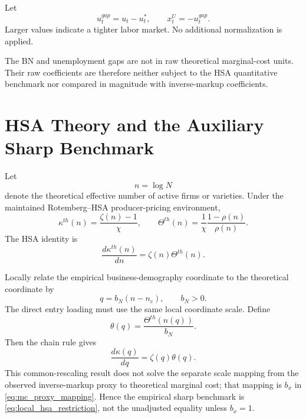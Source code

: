 \documentclass[11pt]{article}
\begin{document}
Let
\begin{equation}
u_t^{gap}=u_t-u_t^\ast,
\qquad
x_t^U=-u_t^{gap}.
\end{equation}
Larger values indicate a tighter labor market. No additional normalization is applied.

The BN and unemployment gaps are not in raw theoretical marginal-cost units. Their raw coefficients are therefore neither subject to the HSA quantitative benchmark nor compared in magnitude with inverse-markup coefficients.

\section{HSA Theory and the Auxiliary Sharp Benchmark}
\label{sec:hsa_benchmark}

Let
\begin{equation}
n=\log N
\end{equation}
denote the theoretical effective number of active firms or varieties. Under the maintained Rotemberg--HSA producer-pricing environment,
\begin{equation}
\kappa^{th}(n)=\frac{\zeta(n)-1}{\chi},
\qquad
\Theta^{th}(n)=\frac{1}{\chi}\frac{1-\rho(n)}{\rho(n)}.
\end{equation}
The HSA identity is
\begin{equation}
\frac{d\kappa^{th}(n)}{dn}=\zeta(n)\Theta^{th}(n).
\label{eq:hsa_identity}
\end{equation}

Locally relate the empirical business-demography coordinate to the theoretical coordinate by
\begin{equation}
q=b_N(n-n_c),
\qquad b_N>0.
\end{equation}
The direct entry loading must use the same local coordinate scale. Define
\begin{equation}
\theta(q)=\frac{\Theta^{th}(n(q))}{b_N}.
\end{equation}
Then the chain rule gives
\begin{equation}
\frac{d\kappa(q)}{dq}=\zeta(q)\theta(q).
\end{equation}
This common-rescaling result does not solve the separate scale mapping from the observed inverse-markup proxy to theoretical marginal cost; that mapping is $b_x$ in \cref{eq:mc_proxy_mapping}. Hence the empirical sharp benchmark is \cref{eq:local_hsa_restriction}, not the unadjusted equality unless $b_x=1$.
\end{document}
